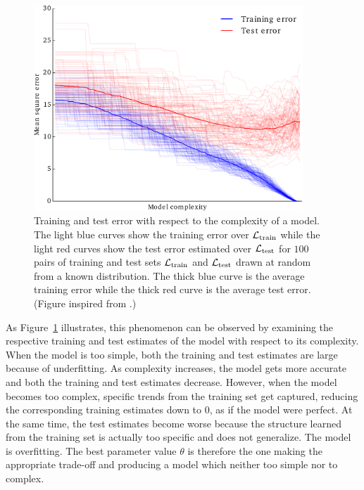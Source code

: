 \begin{figure}
    \centering
    \includegraphics[width=0.9\textwidth]{figures/ch2_train_test_error.pdf}
    \caption{Training and test error with respect to the complexity
             of a model. The light blue curves show the training error over
             ${\cal L}_\text{train}$ while the light red curves show the test
             error estimated over ${\cal L}_\text{test}$ for $100$ pairs of training
             and test sets ${\cal L}_\text{train}$ and ${\cal L}_\text{test}$
             drawn at random from a known distribution. The thick blue curve
             is the average training error while the thick red curve is the
             average test error. (Figure inspired from \citep{hastie:2005}.) }
    \label{fig:train-test-error}
\end{figure}

As Figure~\ref{fig:train-test-error}
illustrates, this phenomenon can be observed by examining the
respective training and test estimates of the model with respect to its
complexity. When the model is too simple, both the training and test estimates
are large because of underfitting. As complexity increases, the model gets more
accurate and both the training and test estimates decrease. However, when the
model becomes too complex, specific trends from the training set get captured,
reducing the corresponding training estimates down to $0$, as if the model were
perfect. At the same time, the test estimates become worse because the
structure learned from the training set is actually too specific and does not
generalize. The model is overfitting. The best parameter value $\theta$ is
therefore the one making the appropriate trade-off and producing a model which
neither too simple nor to complex.

